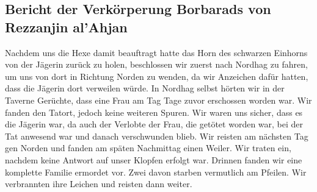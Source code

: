\subsection{Bericht der Verkörperung Borbarads von Rezzanjin al’Ahjan}
Nachdem uns die Hexe damit beauftragt hatte das Horn des schwarzen Einhorns von der Jägerin zurück zu holen, beschlossen wir zuerst nach Nordhag zu fahren, um uns von dort in Richtung Norden zu wenden, da wir Anzeichen dafür hatten, dass die Jägerin dort verweilen würde. In Nordhag selbst hörten wir in der Taverne Gerüchte, dass eine Frau am Tag Tage zuvor erschossen worden war. Wir fanden den Tatort, jedoch keine weiteren Spuren. Wir waren uns sicher, dass es die Jägerin war, da auch der Verlobte der Frau, die getötet worden war, bei der Tat anwesend war und danach verschwunden blieb. Wir reisten am nächsten Tag gen Norden und fanden am späten Nachmittag einen Weiler. Wir traten ein, nachdem keine Antwort auf unser Klopfen erfolgt war. Drinnen fanden wir eine komplette Familie ermordet vor. Zwei davon starben vermutlich am Pfeilen. Wir verbrannten ihre Leichen und reisten dann weiter. \par

